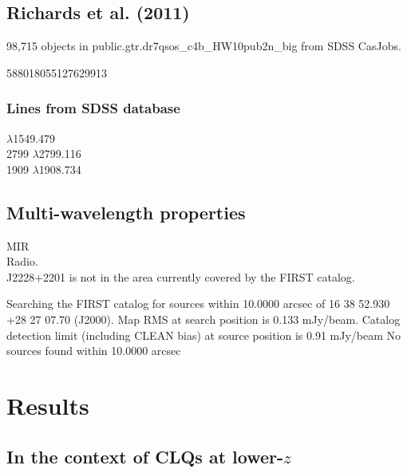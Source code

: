\documentclass[a4paper,fleqn,usenatbib]{mnras}
\begin{document}
\subsection{Richards et al. (2011)}
98,715 objects in %
public.gtr.dr7qsos\_c4b\_HW10pub2n\_big from SDSS CasJobs. 

588018055127629913

\subsubsection{Lines from SDSS database}
\civ  $\lambda$1549.479 \\
2799 $\lambda$2799.116  \\
1909 $\lambda$1908.734 \\


\subsection{Multi-wavelength properties}
MIR \\

Radio. \\ 
J2228+2201 is not in the area currently covered by the FIRST catalog. 

Searching the FIRST catalog for sources within 10.0000 arcsec of 16 38 52.930 +28 27 07.70 (J2000). 
Map RMS at search position is 0.133 mJy/beam. 
Catalog detection limit (including CLEAN bias) at source position is 0.91 mJy/beam
No sources found within 10.0000 arcsec
       


\section{Results}
\subsection{In the context of CLQs at lower-$z$}
\end{document}
